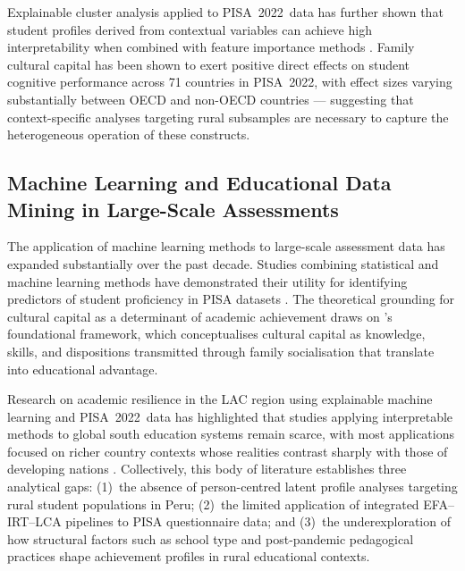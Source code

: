 \documentclass[twocolumn,12pt]{article}
\begin{document}
Explainable cluster analysis applied to PISA~2022~data has further shown
that student profiles derived from contextual variables can achieve high
interpretability when combined with feature importance methods
\parencite{fernandez2024profiles}. Family cultural capital has been shown to
exert positive direct effects on student cognitive performance across 71
countries in PISA~2022, with effect sizes varying substantially between OECD
and non-OECD countries \parencite{zhang2025capital} --- suggesting that
context-specific analyses targeting rural subsamples are necessary to capture
the heterogeneous operation of these constructs.

\subsection{Machine Learning and Educational Data Mining in Large-Scale
Assessments}

The application of machine learning methods to large-scale assessment data
has expanded substantially over the past decade. Studies combining
statistical and machine learning methods have demonstrated their utility for
identifying predictors of student proficiency in PISA datasets
\parencite{soares2024predictors}. The theoretical grounding for cultural
capital as a determinant of academic achievement draws on
\textcite{bourdieu1986capital}'s foundational framework, which
conceptualises cultural capital as knowledge, skills, and dispositions
transmitted through family socialisation that translate into educational
advantage.

Research on academic resilience in the LAC region using explainable machine
learning and PISA~2022~data has highlighted that studies applying
interpretable methods to global south education systems remain scarce, with
most applications focused on richer country contexts whose realities contrast
sharply with those of developing nations \parencite{delprato2025resilience}.
Collectively, this body of literature establishes three analytical gaps:
(1)~the absence of person-centred latent profile analyses targeting rural
student populations in Peru; (2)~the limited application of integrated
EFA--IRT--LCA pipelines to PISA questionnaire data; and (3)~the
underexploration of how structural factors such as school type and
post-pandemic pedagogical practices shape achievement profiles in rural
educational contexts.

\end{document}
